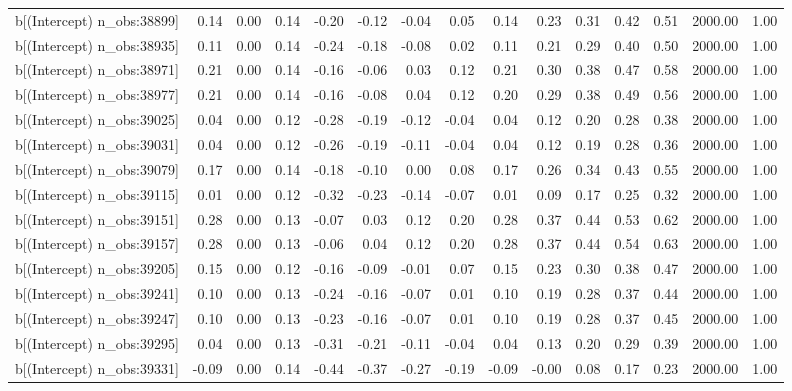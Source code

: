 \begin{table}[ht]
\begin{tabular}{rrrrrrrrrrrrrrr}
  b[(Intercept) n\_obs:38899] & 0.14 & 0.00 & 0.14 & -0.20 & -0.12 & -0.04 & 0.05 & 0.14 & 0.23 & 0.31 & 0.42 & 0.51 & 2000.00 & 1.00 \\ 
  b[(Intercept) n\_obs:38935] & 0.11 & 0.00 & 0.14 & -0.24 & -0.18 & -0.08 & 0.02 & 0.11 & 0.21 & 0.29 & 0.40 & 0.50 & 2000.00 & 1.00 \\ 
  b[(Intercept) n\_obs:38971] & 0.21 & 0.00 & 0.14 & -0.16 & -0.06 & 0.03 & 0.12 & 0.21 & 0.30 & 0.38 & 0.47 & 0.58 & 2000.00 & 1.00 \\ 
  b[(Intercept) n\_obs:38977] & 0.21 & 0.00 & 0.14 & -0.16 & -0.08 & 0.04 & 0.12 & 0.20 & 0.29 & 0.38 & 0.49 & 0.56 & 2000.00 & 1.00 \\ 
  b[(Intercept) n\_obs:39025] & 0.04 & 0.00 & 0.12 & -0.28 & -0.19 & -0.12 & -0.04 & 0.04 & 0.12 & 0.20 & 0.28 & 0.38 & 2000.00 & 1.00 \\ 
  b[(Intercept) n\_obs:39031] & 0.04 & 0.00 & 0.12 & -0.26 & -0.19 & -0.11 & -0.04 & 0.04 & 0.12 & 0.19 & 0.28 & 0.36 & 2000.00 & 1.00 \\ 
  b[(Intercept) n\_obs:39079] & 0.17 & 0.00 & 0.14 & -0.18 & -0.10 & 0.00 & 0.08 & 0.17 & 0.26 & 0.34 & 0.43 & 0.55 & 2000.00 & 1.00 \\ 
  b[(Intercept) n\_obs:39115] & 0.01 & 0.00 & 0.12 & -0.32 & -0.23 & -0.14 & -0.07 & 0.01 & 0.09 & 0.17 & 0.25 & 0.32 & 2000.00 & 1.00 \\ 
  b[(Intercept) n\_obs:39151] & 0.28 & 0.00 & 0.13 & -0.07 & 0.03 & 0.12 & 0.20 & 0.28 & 0.37 & 0.44 & 0.53 & 0.62 & 2000.00 & 1.00 \\ 
  b[(Intercept) n\_obs:39157] & 0.28 & 0.00 & 0.13 & -0.06 & 0.04 & 0.12 & 0.20 & 0.28 & 0.37 & 0.44 & 0.54 & 0.63 & 2000.00 & 1.00 \\ 
  b[(Intercept) n\_obs:39205] & 0.15 & 0.00 & 0.12 & -0.16 & -0.09 & -0.01 & 0.07 & 0.15 & 0.23 & 0.30 & 0.38 & 0.47 & 2000.00 & 1.00 \\ 
  b[(Intercept) n\_obs:39241] & 0.10 & 0.00 & 0.13 & -0.24 & -0.16 & -0.07 & 0.01 & 0.10 & 0.19 & 0.28 & 0.37 & 0.44 & 2000.00 & 1.00 \\ 
  b[(Intercept) n\_obs:39247] & 0.10 & 0.00 & 0.13 & -0.23 & -0.16 & -0.07 & 0.01 & 0.10 & 0.19 & 0.28 & 0.37 & 0.45 & 2000.00 & 1.00 \\ 
  b[(Intercept) n\_obs:39295] & 0.04 & 0.00 & 0.13 & -0.31 & -0.21 & -0.11 & -0.04 & 0.04 & 0.13 & 0.20 & 0.29 & 0.39 & 2000.00 & 1.00 \\ 
  b[(Intercept) n\_obs:39331] & -0.09 & 0.00 & 0.14 & -0.44 & -0.37 & -0.27 & -0.19 & -0.09 & -0.00 & 0.08 & 0.17 & 0.23 & 2000.00 & 1.00 \\ 

\end{tabular}
\end{table}
